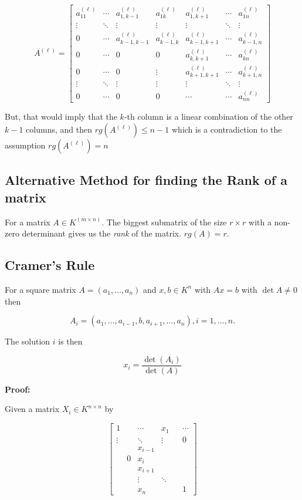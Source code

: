 \[
	A^{(\ell)} =
	\begin{bmatrix}
	a^{(\ell)}_{11} & \cdots & a^{(\ell)}_{1,k-1} & a^{(\ell)}_{1k} & a^{(\ell)}_{1,k+1} & \cdots & a^{(\ell)}_{1n} \\
	\vdots & \ddots & \vdots & \vdots & \vdots & \ddots & \vdots \\
	0 & \cdots & a^{(\ell)}_{k-1,k-1} & a^{(\ell)}_{k-1,k} & a^{(\ell)}_{k-1,k+1} & \cdots & a^{(\ell)}_{k-1,n} \\
	0 & \cdots & 0 & 0 & a^{(\ell)}_{k,k+1} & \cdots & a^{(\ell)}_{kn} \\
	0 & \cdots & 0 & \vdots & a^{(\ell)}_{k+1,k+1} & \cdots & a^{(\ell)}_{k+1,n} \\
	\vdots & \ddots & \vdots & \vdots & \vdots & \ddots & \vdots \\
	0 & \cdots & 0 & 0 & \cdots & \cdots & a^{(\ell)}_{nn}
	\end{bmatrix}
\]

But, that would imply that the \(k\)-th column is a linear combination of the other \(k - 1\) columns, 
and then \(rg(A^{(\ell)}) \le n - 1\) which is a contradiction to the assumption  \(rg(A^{(\ell)}) = n\) 

\QED

\subsection{Alternative Method for finding the Rank of a matrix}

For a matrix \(A \in K^{(m \times n)}\). The biggest submatrix of the size \(r \times r\) with a 
non-zero determinant gives us the \emph{rank} of the matrix. \(rg(A) = r\).

\subsection{Cramer's Rule}

For a square matrix \(A = (a_1, \dots, a_n)\) and \(x,b \in K^{n}\) with \(Ax = b\) with \(\det A \ne 0\) 
then

\[
	A_i = (a_1, \dots, a_{i - 1}, b, a_{i + 1}, \dots, a_n), i = 1,\dots,n.
\]

The solution \(i\) is then

\[
	x_i = \frac{\det(A_i)}{\det(A)}
\]

\textbf{Proof:}

Given a matrix \(X_i \in K^{n \times n}\) by

\[
	\begin{bmatrix}
		1  &  &\cdots     & x_1    & &\cdots \\
	\vdots &  &\ddots     & \vdots & & 0     \\
		&  &x_{i - 1}  &        & &       \\
		&0 & x_i 	  &		   & &       \\
		&  & x_{i + 1} &        & &       \\
		&  & \vdots    & \ddots & &       \\
		&  & x_n       &        & &    1   
	\end{bmatrix}
\]

